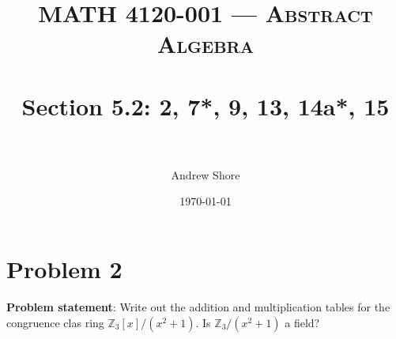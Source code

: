 \documentclass{article} %
\title{ 
\normalfont \normalsize 
\textsc{MATH 4120-001 --- Abstract Algebra} \\
\horrule{0.5pt} \\[0cm] %
\huge Section 5.2: 2, 7*, 9, 13, 14a*, 15 \\ %
\horrule{2pt} \\[0cm] %
}
\author{Andrew Shore} %
\date{\normalsize\today} %
\begin{document}
\maketitle %

\section*{Problem 2}


\textbf{Problem statement}: Write out the addition and multiplication tables for the congruence clas ring $\mathbb{Z}_3[x]/(x^2+1)$.  Is $\mathbb{Z}_3/(x^2+1)$ a field?
\\
\end{document}
